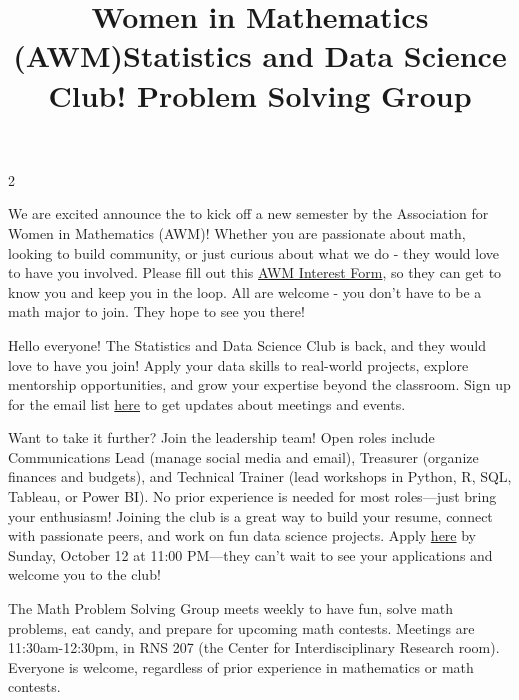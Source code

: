 \documentclass[12pt]{article}
\newcommand{\bolder}{\textbf}
\begin{document}
\begin{multicols}{2}
\begin{tcolorbox}[colback=white, colframe=black]
    \begin{center}
    \title{{\large \bolder{Women in Mathematics (AWM)}}}
    \end{center}
\end{tcolorbox}

We are excited announce the to kick off a new semester by the Association for Women in Mathematics (AWM)! Whether you are passionate about math, looking to build community, or just curious about what we do - they would love to have you involved. Please fill out this \href{https://docs.google.com/forms/d/e/1FAIpQLScYRxJUW1Kez2SKb9FY_rZgEhTlFKsD0dvfugCnlX8Vg2LVsw/viewform}{AWM Interest Form}, so they can get to know you and keep you in the loop. All are welcome - you don't have to be a math major to join. They hope to see you there!


\begin{tcolorbox}[colback=white, colframe=black]
    \begin{center}
    \title{{\large \bolder{Statistics and Data Science Club!
}}}
    \end{center}
\end{tcolorbox}

Hello everyone! The Statistics and Data Science Club is back, and they would love to have you join! Apply your data skills to real-world projects, explore mentorship opportunities, and grow your expertise beyond the classroom. Sign up for the email list \href{https://docs.google.com/forms/d/e/1FAIpQLSeV00ldRadWwtvfA8nmOIuL43iZ0MFHp6O5cmrPY5HAsxVJMQ/viewform}{here} to get updates about meetings and events. 

Want to take it further? Join the leadership team! Open roles include Communications Lead (manage social media and email), Treasurer (organize finances and budgets), and Technical Trainer (lead workshops in Python, R, SQL, Tableau, or Power BI). No prior experience is needed for most roles—just bring your enthusiasm! Joining the club is a great way to build your resume, connect with passionate peers, and work on fun data science projects. Apply  \href{https://docs.google.com/forms/d/e/1FAIpQLSesdKFkZ-tmqlWbbFPcFsuYMH_wUt3lPhb5v_Nx6mrfpPuf5A/viewform}{here} by Sunday, October 12 at 11:00 PM—they can’t wait to see your applications and welcome you to the club!


\begin{tcolorbox}[colback=white, colframe=black]
    \begin{center}
    \title{{\large \bolder{Problem Solving Group}}}
    \end{center}
\end{tcolorbox}
The Math Problem Solving Group meets weekly to have fun, solve math problems, eat candy, and prepare for upcoming math contests. Meetings are 11:30am-12:30pm, in RNS 207 (the Center for Interdisciplinary Research room). Everyone is welcome, regardless of prior experience in mathematics or math contests.


\end{multicols}
\end{document}
